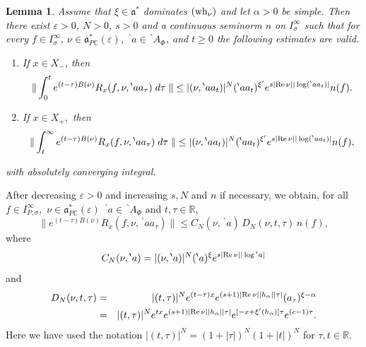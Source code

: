 \documentclass[12pt,a4paper]{article}
\newtheorem{Lemma}[Thm]{Lemma}
\newenvironment{lemma}[0]{\begin{Lemma}\noindent}%
{\end{Lemma}}
\def\proof{\par\noindent{\it Proof.}{\ }{\ }}
\def\itema{\vspace{-1mm}\item[{\rm (a)}]}
\def\itemb{\item[{\rm (b)}]}
\def\msy#1{{\mathbb #1}}
\def\C{{\msy C}}
\def\R{{\msy R}}
\def\ga{\alpha}
\def\ge{\varepsilon}
\def\gs{\sigma}
\def\got#1{\mathfrak #1}
\def\fa{{\got a}}
\def\Re{{\rm Re}\,}
\def\iC{{\scriptscriptstyle \C}}
\numberwithin{Thm}{section}
\numberwithin{equation}{section}
\def\faPdc{{\fa_{P\iC}^*}}
\numberwithin{equation}{section}
\def\fad{{\fa^*}}
\def\bp{\!{\,}^\backprime}
\def\faPdc{\fa_{P\iC}^*}
\def\snorm{n}
\def\IPgs{I_{P,\gs}^\infty}
\def\wh{{\rm wh}}
\def\xx{x}
\def\xxi{\xi}
\begin{document}
\begin{lemma}
\label{l: estimate integral of R xi}
Assume that $\xxi \in \fad$ dominates $(\wh_\nu)$ and let $\ga > 0$ be simple.
Then there exist $\ge>0$, $N > 0$, $  s>0 $ and a continuous seminorm $\snorm$ on $I_\gs^\infty$ such that for every $f \in I_\gs^\infty$, $\nu \in \faPdc(\ge)$, $\bp a \in \bp A_\Phi$,
and $t \geq 0$ the following estimates are valid.
\begin{enumerate}
\itema
If $\xx \in X_-$, then 
$$ 
\| \int_0^t e^{(t -\tau) B(\nu)} R_\xx(f, \nu, \bp aa_\tau)\; d\tau \;\| \leq 
|(\nu, \bp aa_t)|^{N} (\bp aa_t)^{\xxi'}  e^{s|\Re \nu||\log (\bp a a_t) | }\snorm(f).
$$ 
\itemb
If $\xx \in X_+,$ then 
$$ 
\| \int_t^\infty e^{(t -\tau)B(\nu)} R_\xx(f, \nu, \bp aa_\tau)\; d\tau\;  \| \leq 
|(\nu, \bp aa_t)|^{N} (\bp aa_t)^{\xxi'}  e^{s|\Re \nu||\log (\bp a a_t) | }\snorm(f),
$$
\end{enumerate}
with absolutely converging integral.
\end{lemma}

\proof
After decreasing $\ge >0$ and increasing $s,N$ and $\snorm$ if necessary, we obtain, for all $f\in 
\IPgs,$ $\nu \in \faPdc(\ge)$ $\bp a \in \bp A_\Phi$ and $t, \tau \in \R $, 
\begin{equation} 
\label{e: estimate R xi}
\|e^{(t-\tau) B(\nu)} R_\xx(f,\nu, \bp aa_\tau) \| \leq   C_N(\nu, \bp a)\, D_N(\nu, t, \tau)\, \snorm(f),
\end{equation} 
where
$$ 
C_N(\nu, \bp a) = |(\nu, \bp a)|^N (\bp a)^\xxi e^{s|\Re \nu| |\log \bp a|}
$$
and  
\begin{eqnarray*}
D_N(\nu,t, \tau) &  =  & 
|(t,\tau)|^{N} e^{(t - \tau)\xx} e^{ (s+ 1) |\Re \nu| |h_\ga||\tau|}
(a_\tau)^{\xxi - \ga}\\
&=& |(t,\tau)|^{N} e^{t\xx}e^{ (s+1) |\Re \nu| |h_\ga||\tau|}  e^{[ -\xx + \xxi'(h_\ga)]\tau} e^{(c-1)\tau} .
\end{eqnarray*}
Here we have used the notation
$
|(t,\tau)|^{N} = ( 1 + |\tau|)^N (1 +|t|)^N
$ 
for $\tau, t \in \R.$ 
\end{document}

